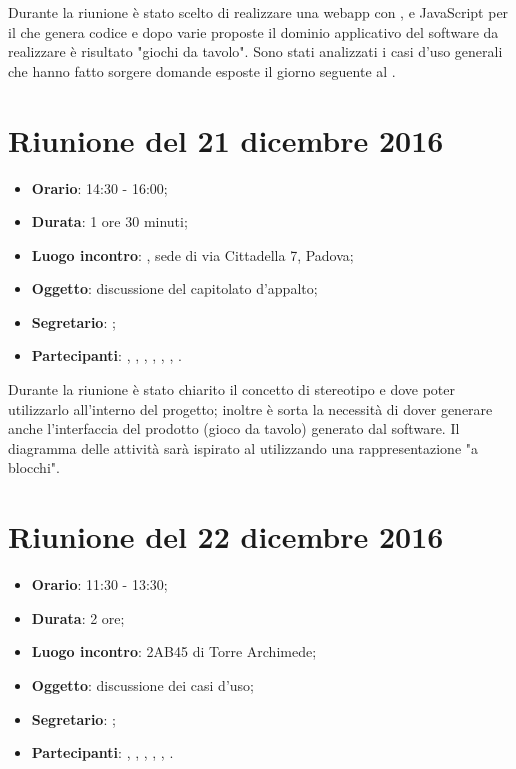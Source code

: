 Durante la riunione è stato scelto di realizzare una webapp con , e JavaScript per il  che genera codice  e dopo varie proposte il dominio applicativo del software da realizzare è risultato "giochi da tavolo". 
Sono stati analizzati i casi d'uso generali che hanno fatto sorgere domande esposte il giorno seguente al \GP.



\section{Riunione del 21 dicembre 2016}

\begin{itemize}
	\item \textbf{Orario}: 14:30 - 16:00;
	\item \textbf{Durata}: 1 ore 30 minuti;
	\item \textbf{Luogo incontro}: \ZU, sede di via Cittadella 7, Padova; 
	\item \textbf{Oggetto}: discussione del capitolato d'appalto;
	\item \textbf{Segretario}: \AZ; 
	\item \textbf{Partecipanti}: \GP, \AZ, \GG, \LB, \LS, \MM, \PB.
\end{itemize}

Durante la riunione è stato chiarito il concetto di stereotipo e dove poter utilizzarlo all'interno del progetto; inoltre è sorta la necessità di dover generare anche l'interfaccia del prodotto (gioco da tavolo) generato dal software. Il diagramma delle attività sarà ispirato al  utilizzando una rappresentazione "a blocchi".



\section{Riunione del 22 dicembre 2016}

\begin{itemize}
	\item \textbf{Orario}: 11:30 - 13:30;
	\item \textbf{Durata}: 2 ore;
	\item \textbf{Luogo incontro}: 2AB45 di Torre Archimede; 
	\item \textbf{Oggetto}: discussione dei casi d'uso;
	\item \textbf{Segretario}: \PB; 
	\item \textbf{Partecipanti}: \AZ, \GG, \LB, \LS, \MM, \PB.
\end{itemize}

